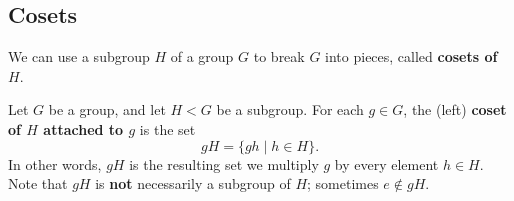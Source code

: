 \documentclass[math1530-lecture-notes]{subfiles}
\begin{document}
\subsection{Cosets}
We can use a subgroup $H$ of a group $G$ to break $G$ into pieces, called \textbf{cosets of $H$}.
\begin{definition}[Cosets]{}
  Let $G$ be a group, and let $H < G$ be a subgroup. For each $g\in G$, the (left) \textbf{coset of
  $H$ attached to $g$} is the set \[
    gH = \{gh\mid h\in H\} 
  .\] In other words, $gH$ is the resulting set we multiply $g$ by every element $h\in H$.\\

  Note that $gH$ is \textbf{not} necessarily a subgroup of $H $; sometimes $e\not\in gH$.
\end{definition}
\end{document}
